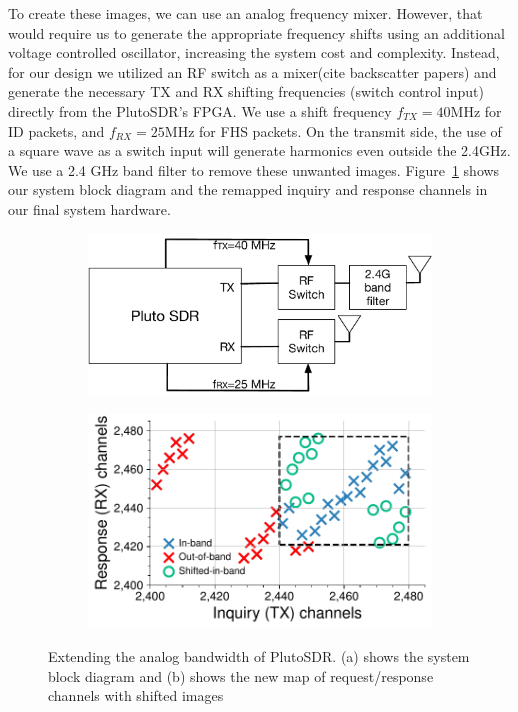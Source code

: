 To create these images, we can use an analog frequency mixer.
%
However, that would require us to generate the appropriate frequency shifts using an additional voltage controlled oscillator, increasing the system cost and complexity.
%
Instead, for our design we utilized an RF switch as a mixer(cite backscatter papers) and generate the necessary TX and RX shifting frequencies (switch control input) directly from the PlutoSDR's FPGA.
%
We use a shift frequency $f_{TX}=40$MHz for ID packets, and $f_{RX}=25$MHz for FHS packets. 
%
On the transmit side, the use of a square wave as a switch input will generate harmonics even outside the 2.4GHz. We use a 2.4 GHz band filter to remove these unwanted images.
%
Figure~\ref{fig:hyperscanner:bwextend} shows our system block diagram and the remapped inquiry and response channels in our final system hardware.
%
\begin{figure}[h!]
    \centering
    \begin{subfigure}{0.4\textwidth}
        \includegraphics[width=\textwidth]{hyperscanner/figs/system_design.pdf}
        \caption{}
    \end{subfigure}
    \hfill
    \begin{subfigure}{0.55\textwidth}
        \includegraphics[width=\textwidth]{hyperscanner/plots/inq_resp_shifted.pdf}
        \caption{}
    \end{subfigure}
    \captionsetup{justification=centering}
    \caption{Extending the analog bandwidth of PlutoSDR. (a) shows the system block diagram and (b) shows the new map of request/response channels with shifted images}
    \label{fig:hyperscanner:bwextend}
\end{figure}
